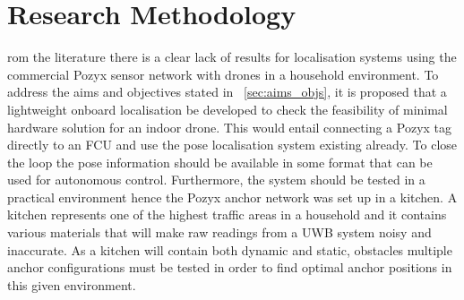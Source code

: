 \chapter{Research Methodology}\label{ch:research-methodology}
rom the literature there is a clear lack of results for localisation systems using the commercial Pozyx sensor network with drones in a household environment.
To address the aims and objectives stated in ~\ref{sec:aims_objs}, it is proposed that a lightweight onboard localisation be developed to check the feasibility of minimal hardware solution for an indoor drone.
This would entail connecting a Pozyx tag directly to an FCU and use the pose localisation system existing already.
To close the loop the pose information should be available in some format that can be used for autonomous control.
Furthermore, the system should be tested in a practical environment hence the Pozyx anchor network was set up in a kitchen.
A kitchen represents one of the highest traffic areas in a household and it contains various materials that will make raw readings from a UWB system noisy and inaccurate.
As a kitchen will contain both dynamic and static, obstacles multiple anchor configurations must be tested in order to find optimal anchor positions in this given environment.

